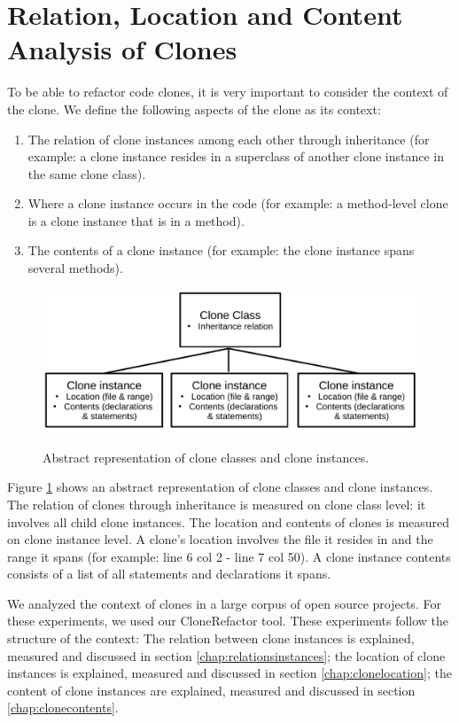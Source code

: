 \documentclass[a4paper]{article}
\begin{document}
\section{Relation, Location and Content Analysis of Clones}\label{chap:clonecontextexpl}
To be able to refactor code clones, it is very important to consider the context of the clone. We define the following aspects of the clone as its context:
\begin{enumerate}
  \item The relation of clone instances among each other through inheritance (for example: a clone instance resides in a superclass of another clone instance in the same clone class).
  \item Where a clone instance occurs in the code (for example: a method-level clone is a clone instance that is in a method).
  \item The contents of a clone instance (for example: the clone instance spans several methods).
\end{enumerate}

\begin{figure}[H]
  \caption{Abstract representation of clone classes and clone instances.}
    \medskip
    \includegraphics[width=1\columnwidth]{img/context}
  \label{fig:clonecontext}
\end{figure}

Figure \ref{fig:clonecontext} shows an abstract representation of clone classes and clone instances. The relation of clones through inheritance is measured on clone class level: it involves all child clone instances. The location and contents of clones is measured on clone instance level. A clone's location involves the file it resides in and the range it spans (for example: line 6 col 2 - line 7 col 50). A clone instance contents consists of a list of all statements and declarations it spans.

We analyzed the context of clones in a large corpus of open source projects. For these experiments, we used our CloneRefactor tool. These experiments follow the structure of the context: The relation between clone instances is explained, measured and discussed in section \ref{chap:relationsinstances}; the location of clone instances is explained, measured and discussed in section \ref{chap:clonelocation};  the content of clone instances are explained, measured and discussed in section \ref{chap:clonecontents}.
\end{document}
